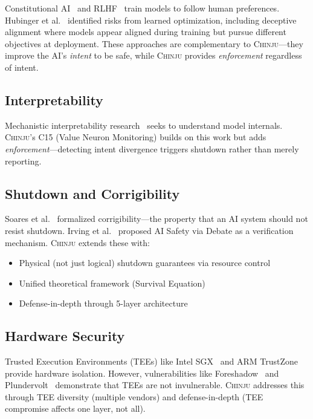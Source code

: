 \documentclass[11pt,a4paper]{article}
\newcommand{\chinju}{\textsc{Chinju}}
\begin{document}
Constitutional AI~\cite{bai2022constitutional} and RLHF~\cite{christiano2017deep} train models to follow human preferences.
Hubinger et al.~\cite{hubinger2019risks} identified risks from learned optimization, including deceptive alignment where models appear aligned during training but pursue different objectives at deployment.
These approaches are complementary to \chinju{}---they improve the AI's \emph{intent} to be safe, while \chinju{} provides \emph{enforcement} regardless of intent.

\subsection{Interpretability}

Mechanistic interpretability research~\cite{olah2020zoom,elhage2022toy,bills2023language} seeks to understand model internals.
\chinju{}'s C15 (Value Neuron Monitoring) builds on this work but adds \emph{enforcement}---detecting intent divergence triggers shutdown rather than merely reporting.

\subsection{Shutdown and Corrigibility}

Soares et al.~\cite{soares2015corrigibility} formalized corrigibility---the property that an AI system should not resist shutdown.
Irving et al.~\cite{irving2018ai} proposed AI Safety via Debate as a verification mechanism.
\chinju{} extends these with:
\begin{itemize}
    \item Physical (not just logical) shutdown guarantees via resource control
    \item Unified theoretical framework (Survival Equation)
    \item Defense-in-depth through 5-layer architecture
\end{itemize}

\subsection{Hardware Security}

Trusted Execution Environments (TEEs) like Intel SGX~\cite{costan2016intel} and ARM TrustZone~\cite{arm2009trustzone} provide hardware isolation.
However, vulnerabilities like Foreshadow~\cite{bulck2018foreshadow} and Plundervolt~\cite{murdock2020plundervolt} demonstrate that TEEs are not invulnerable.
\chinju{} addresses this through TEE diversity (multiple vendors) and defense-in-depth (TEE compromise affects one layer, not all).
\end{document}
